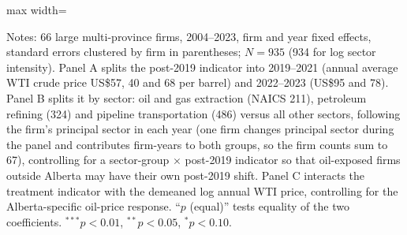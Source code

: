 \begin{table}[htbp]
\begin{adjustbox}{max width=\textwidth}
\end{adjustbox}
\par\vspace{3pt}\begin{minipage}{\textwidth}\footnotesize
Notes: 66 large multi-province firms, 2004--2023, firm and year fixed effects, standard errors clustered by firm in parentheses; $N=935$ (934 for log sector intensity). Panel A splits the post-2019 indicator into 2019--2021 (annual average WTI crude price US\$57, 40 and 68 per barrel) and 2022--2023 (US\$95 and 78). Panel B splits it by sector: oil and gas extraction (NAICS 211), petroleum refining (324) and pipeline transportation (486) versus all other sectors, following the firm's principal sector in each year (one firm changes principal sector during the panel and contributes firm-years to both groups, so the firm counts sum to 67), controlling for a sector-group $\times$ post-2019 indicator so that oil-exposed firms outside Alberta may have their own post-2019 shift. Panel C interacts the treatment indicator with the demeaned log annual WTI price, controlling for the Alberta-specific oil-price response. ``$p$ (equal)'' tests equality of the two coefficients. $^{***}p<0.01$, $^{**}p<0.05$, $^{*}p<0.10$.
\end{minipage}
\end{table}
